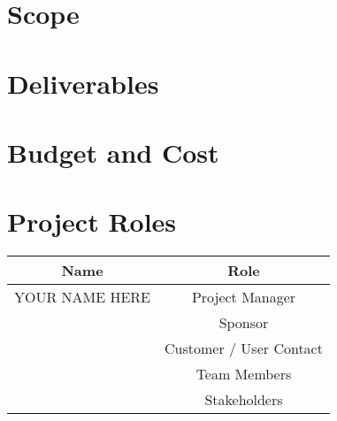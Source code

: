 \documentclass[12pt]{charter}
\begin{document}
\section*{Scope}
\label{sec:scope}

\section*{Deliverables}
\label{sec:deliverables}

\section*{Budget and Cost}
\label{sec:budgetcost}

\section*{Project Roles}
\label{sec:roles}
\begin{table}[h]
  \label{tbl:roles}
  \begin{center}
    \begin{tabular}{c|c}
      Name & Role\\\hline
      YOUR NAME HERE & Project Manager\\\hline
      & Sponsor\\\hline
      & Customer / User Contact\\\hline
      & Team Members\\\hline
      & Stakeholders\\\hline
    \end{tabular}
  \end{center}
\end{table}
\end{document}
